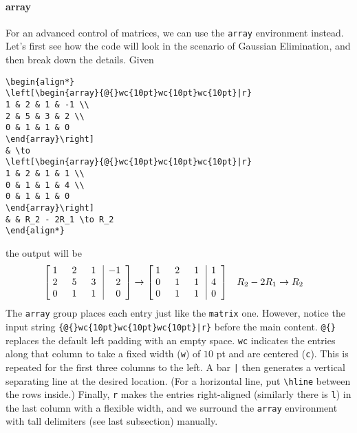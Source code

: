 \paragraph{array}
For an advanced control of matrices, we can use the \verb|array| environment instead. Let's first see how the code will look in the scenario of Gaussian Elimination, and then break down the details. Given
\begin{lstlisting}
\begin{align*}
\left[\begin{array}{@{}wc{10pt}wc{10pt}wc{10pt}|r}
1 & 2 & 1 & -1 \\
2 & 5 & 3 & 2 \\
0 & 1 & 1 & 0
\end{array}\right] 
& \to 
\left[\begin{array}{@{}wc{10pt}wc{10pt}wc{10pt}|r}
1 & 2 & 1 & 1 \\
0 & 1 & 1 & 4 \\
0 & 1 & 1 & 0
\end{array}\right] 
& & R_2 - 2R_1 \to R_2
\end{align*}
\end{lstlisting}
the output will be
\begin{align*}
\left[\begin{array}{@{}wc{10pt}wc{10pt}wc{10pt}|r}
1 & 2 & 1 & -1 \\
2 & 5 & 3 & 2 \\
0 & 1 & 1 & 0
\end{array}\right] 
& \to 
\left[\begin{array}{@{}wc{10pt}wc{10pt}wc{10pt}|r}
1 & 2 & 1 & 1 \\
0 & 1 & 1 & 4 \\
0 & 1 & 1 & 0
\end{array}\right] 
& & R_2 - 2R_1 \to R_2
\end{align*}
The \verb|array| group places each entry just like the \verb|matrix| one. However, notice the input string \texttt{\{@\{\}wc\{10pt\}wc\{10pt\}wc\{10pt\}|r\}} before the main content. \texttt{@\{\}} replaces the default left padding with an empty space. \texttt{wc} indicates the entries along that column to take a fixed width (\verb|w|) of $10$ pt and are centered (\verb|c|). This is repeated for the first three columns to the left. A bar \texttt{|} then generates a vertical separating line at the desired location. (For a horizontal line, put \texttt{\textbackslash hline} between the rows inside.) Finally, \texttt{r} makes the entries right-aligned (similarly there is \verb|l|) in the last column with a flexible width, and we surround the \verb|array| environment with tall delimiters (see last subsection) manually.

